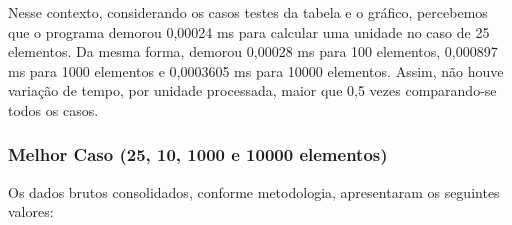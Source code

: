 \documentclass[a4paper, 12pt]{article}
\begin{document}
\begin{minipage}{1.0\textwidth}
\begin{minipage}[c]{0.49\textwidth}
  \end{minipage}
 \hfill
 \begin{minipage}[c]{0.49\textwidth}
 \centering
{}
\end{minipage}
\end{minipage}


\vspace{0.8cm}
Nesse contexto, considerando os casos testes da tabela e o gráfico, percebemos que o programa demorou 0,00024 ms para calcular uma unidade no caso de 25 elementos. Da mesma forma, demorou 0,00028 ms para 100 elementos, 0,000897 ms para 1000 elementos e 0,0003605 ms para 10000 elementos. Assim, não houve variação de tempo, por unidade processada, maior que 0,5 vezes comparando-se todos os casos.


\subsubsection{Melhor Caso (25, 10, 1000 e 10000 elementos)}
Os dados brutos consolidados, conforme metodologia, apresentaram os seguintes valores:
\vspace{0.2cm}
\end{document}
